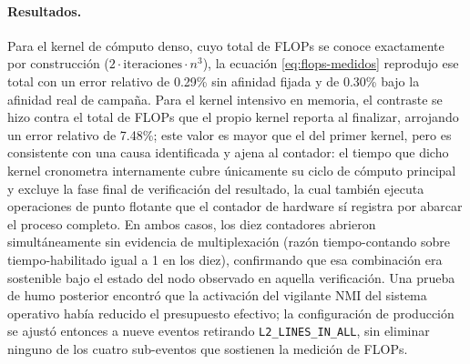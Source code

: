 \documentclass[12pt,oneside,spanish]{book}
\begin{document}
\paragraph{Resultados.} Para el kernel de cómputo denso, cuyo total de FLOPs se conoce exactamente por construcción ($2 \cdot \text{iteraciones} \cdot n^{3}$), la ecuación \eqref{eq:flops-medidos} reprodujo ese total con un error relativo de 0.29\% sin afinidad fijada y de 0.30\% bajo la afinidad real de campaña. Para el kernel intensivo en memoria, el contraste se hizo contra el total de FLOPs que el propio kernel reporta al finalizar, arrojando un error relativo de 7.48\%; este valor es mayor que el del primer kernel, pero es consistente con una causa identificada y ajena al contador: el tiempo que dicho kernel cronometra internamente cubre únicamente su ciclo de cómputo principal y excluye la fase final de verificación del resultado, la cual también ejecuta operaciones de punto flotante que el contador de hardware sí registra por abarcar el proceso completo. En ambos casos, los diez contadores abrieron simultáneamente sin evidencia de multiplexación (razón tiempo-contando sobre tiempo-habilitado igual a 1 en los diez), confirmando que esa combinación era sostenible bajo el estado del nodo observado en aquella verificación. Una prueba de humo posterior encontró que la activación del vigilante NMI del sistema operativo había reducido el presupuesto efectivo; la configuración de producción se ajustó entonces a nueve eventos retirando \texttt{L2\_LINES\_IN\_ALL}, sin eliminar ninguno de los cuatro sub-eventos que sostienen la medición de FLOPs.
\end{document}
